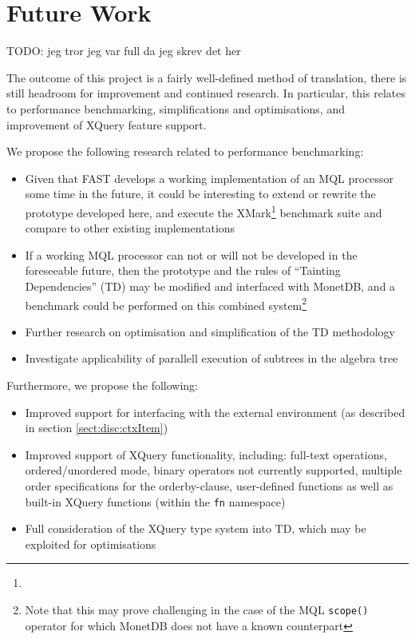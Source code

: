 \chapter{Future Work}
\label{chapter:future}

TODO: jeg tror jeg var full da jeg skrev det her

The outcome of this project is a fairly well-defined method of translation,
there is still headroom for improvement and continued research. In particular,
this relates to performance benchmarking, simplifications and optimisations,
and improvement of XQuery feature support.

We propose the following research related to performance benchmarking:
\begin{itemize}
  \item Given that FAST develops a working implementation of an MQL processor
  some time in the future, it could be interesting to extend or rewrite the
  prototype developed here, and execute the
  XMark\footnote{} 
  benchmark suite and compare to other existing implementations
  \item If a working MQL processor can not or will not be developed in the
  foreseeable future, then the prototype and the rules of ``Tainting
  Dependencies'' (TD) may be modified and interfaced with MonetDB, and a
  benchmark could be performed on this combined system\footnote{Note that this may prove challenging in the case of
  the MQL \texttt{scope()} operator for which MonetDB does not have a known
  counterpart}
  \item Further research on optimisation and simplification of the TD
  methodology
  \item Investigate applicability of parallell execution of subtrees in the
  algebra tree
\end{itemize}

Furthermore, we propose the following:
\begin{itemize}
  \item Improved support for interfacing with the external environment (as
  described in section \ref{sect:disc:ctxItem})
  \item Improved support of XQuery functionality, including: full-text
  operations, ordered/unordered mode, binary operators not currently supported,
  multiple order specifications for the orderby-clause, user-defined functions
  as well as built-in XQuery functions (within the \texttt{fn} namespace)
  \item Full consideration of the XQuery type system into TD, which may be
  exploited for optimisations
\end{itemize}
